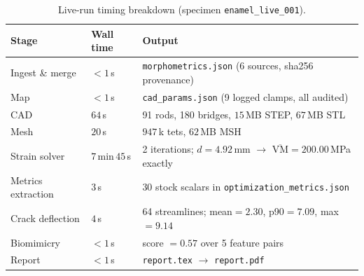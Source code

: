 \documentclass[11pt, letterpaper]{article}
\begin{document}
\begin{table}[h!]
\centering
\caption{Live-run timing breakdown (specimen \texttt{enamel\_live\_001}).}
\label{tab:timing}
\small
\renewcommand{\arraystretch}{1.3}
\begin{tabularx}{\linewidth}{l l X}
\toprule
\textbf{Stage} & \textbf{Wall time} & \textbf{Output} \\
\midrule
Ingest \& merge      & $< 1$\,s  & \texttt{morphometrics.json} (6 sources, sha256 provenance) \\
Map                  & $< 1$\,s  & \texttt{cad\_params.json} (9 logged clamps, all audited) \\
CAD                  & $64$\,s   & 91 rods, 180 bridges, $15$\,MB STEP, $67$\,MB STL \\
Mesh                 & $20$\,s   & $947$\,k tets, $62$\,MB MSH \\
Strain solver        & $7$\,min\,$45$\,s & 2 iterations; $d{=}4.92$\,mm $\to$ $\overline{\mathrm{VM}}{=}200.00$\,MPa exactly \\
Metrics extraction   & $3$\,s    & 30 stock scalars in \texttt{optimization\_metrics.json} \\
Crack deflection     & $4$\,s    & 64 streamlines; mean$=2.30$, p90$=7.09$, max$=9.14$ \\
Biomimicry           & $<1$\,s   & score $= 0.57$ over 5 feature pairs \\
Report               & $<1$\,s   & \texttt{report.tex} $\to$ \texttt{report.pdf} \\
\bottomrule
\end{tabularx}
\end{table}
\end{document}
